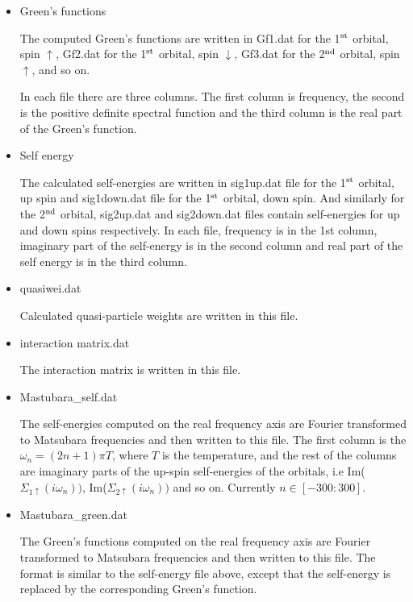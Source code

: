 \documentclass[a4paper]{article}
\begin{document}
\begin{itemize}
\item{Green's functions}

The computed Green's functions are written in Gf1.dat for the 1$^{\rm st}$ orbital,
spin $\uparrow$,
Gf2.dat for the 1$^{\rm st}$ orbital, spin $\downarrow$, Gf3.dat for the 2$^{\rm nd}$ orbital, spin $\uparrow$, and so on.

In each file there are three columns. The first column is frequency, the second is
the positive definite spectral function and the third column is the real part of the Green's function.

\item{Self energy}

The calculated self-energies are written in sig1up.dat file for the 1$^{\rm st}$ orbital,
 up spin and sig1down.dat file for the 1$^{\rm st}$ orbital, down spin. And
similarly for the 2$^{\rm nd}$ orbital, sig2up.dat and sig2down.dat files contain
self-energies for up and down spins respectively. In each file, frequency is in the 1st column, imaginary part of the self-energy is in the second column and real part of the self energy is 
in the third column.

\item{quasiwei.dat}

Calculated quasi-particle weights are written in this file.

\item interaction matrix.dat

The interaction matrix is written in this file.


\item Mastubara\_self.dat

The self-energies computed on the real frequency axis are Fourier transformed
to Matsubara frequencies and then written to this file. The first column is
the $\omega_n=(2n+1)\pi T$, where $T$ is the temperature, and the rest of the columns
are imaginary parts of the up-spin self-energies of the orbitals, i.e
Im($\Sigma_{1\uparrow}(i\omega_n))$, Im($\Sigma_{2\uparrow}(i\omega_n))$
and so on. Currently $n\in [-300:300]$.


\item Mastubara\_green.dat 

The Green's functions computed on the real frequency axis are Fourier transformed
to Matsubara frequencies and then written to this file. The format is similar to the self-energy file above, except that the self-energy is replaced by the corresponding Green's function.

\end{itemize}
\end{document}
